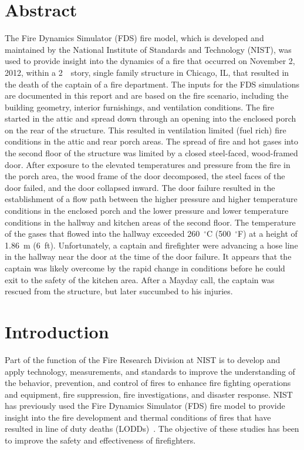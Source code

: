 \documentclass[12pt,oneside]{book}
\begin{document}
\chapter*{\centering Abstract}
The Fire Dynamics Simulator (FDS) fire model, which is developed and maintained by the National Institute of Standards and Technology (NIST), was used to provide insight into the dynamics of a fire that occurred on November 2, 2012, within a 2~~story, single family structure in Chicago, IL, that resulted in the death of the captain of a fire department. The inputs for the FDS simulations are documented in this report and are based on the fire scenario, including the building geometry, interior furnishings, and ventilation conditions. The fire started in the attic and spread down through an opening into the enclosed porch on the rear of the structure. This resulted in ventilation limited (fuel rich) fire conditions in the attic and rear porch areas. The spread of fire and hot gases into the second floor of the structure was limited by a closed steel-faced, wood-framed door. After exposure to the elevated temperatures and pressure from the fire in the porch area, the wood frame of the door decomposed, the steel faces of the door failed, and the door collapsed inward. The door failure resulted in the establishment of a flow path between the higher pressure and higher temperature conditions in the enclosed porch and the lower pressure and lower temperature conditions in the hallway and kitchen areas of the second floor. The temperature of the gases that flowed into the hallway exceeded 260~$^{\circ}$C (500~$^{\circ}$F) at a height of 1.86~m (6~ft). Unfortunately, a captain and firefighter were advancing a hose line in the hallway near the door at the time of the door failure. It appears that the captain was likely overcome by the rapid change in conditions before he could exit to the safety of the kitchen area. After a Mayday call, the captain was rescued from the structure, but later succumbed to his injuries.

\chapter{Introduction}
Part of the function of the Fire Research Division at NIST is to develop and apply technology, measurements, and standards to improve the understanding of the behavior, prevention, and control of fires to enhance fire fighting operations and equipment, fire suppression, fire investigations, and disaster response. NIST has previously used the Fire Dynamics Simulator (FDS) fire model to provide insight into the fire development and thermal conditions of fires that have resulted in line of duty deaths (LODDs)~\cite{Madrzykowski:1,Iowa,Texas,Bryner:Charleston,barowy:texas}. The objective of these studies has been to improve the safety and effectiveness of firefighters.
\end{document}
